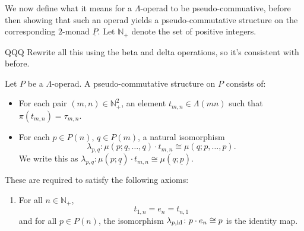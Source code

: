 We now define what it means for a $\Lambda$-operad to be pseudo-commuative, before then showing that such an operad yields a pseudo-commutative structure on the corresponding $2$-monad $\underline{P}$. Let $\mathbb{N}_{+}$ denote the set of positive integers.

QQQ Rewrite all this using the beta and delta operations, so it's consistent with before.
\begin{Defi}\label{def:ps-comm_operad}
Let $P$ be a $\Lambda$-operad. A pseudo-commutative structure on $P$ consists of:
    \begin{itemize}
        \item For each pair $(m,n) \in \mathbb{N}_{+}^2$, an element $t_{m,n} \in \Lambda(mn)$ such that $\pi(t_{m,n}) = \tau_{m,n}$.
        \item For each $p \in P(n)$, $q \in P(m)$, a natural isomorphism
            \[
                \lambda_{p,q} \colon \mu(p;q,\ldots,q) \cdot t_{m,n} \cong \mu(q;p,\ldots,p).
            \]
            We write this as $\lambda_{p,q}\colon \mu(p; \underline{q}) \cdot t_{m,n} \cong \mu(q; \underline{p})$.
    \end{itemize}
These are required to satisfy the following axioms:  
    \begin{enumerate}
        \item\label{axiom:t_id} For all $n \in \mathbb{N}_+$,
            \[
                t_{1,n} = e_n = t_{n,1}
            \]
             and for all $p \in P(n)$, the isomorphism $\lambda_{p, \textrm{id}}\colon p \cdot e_n \cong p$ is the identity map.

\end{enumerate}
\end{Defi}
